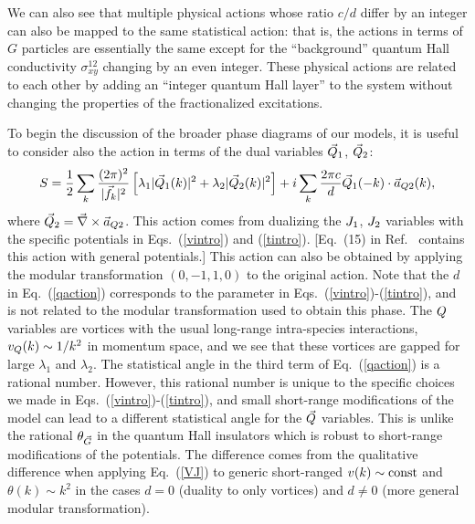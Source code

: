 We can also see that multiple physical actions whose ratio $c/d$ differ by an integer can also be mapped to the same statistical action: that is, the actions in terms of $G$ particles are essentially the same except for the ``background'' quantum Hall conductivity $\sigma^{12}_{xy}$ changing by an even integer. These physical actions are related to each other by adding an ``integer quantum Hall layer'' to the system without changing the properties of the fractionalized excitations. 

To begin the discussion of the broader phase diagrams of our models, it is useful to consider also the action in terms of the dual variables $\vec{Q}_1$, $\vec{Q}_2$:
\begin{eqnarray}
S = \frac{1}{2}\sum_k \frac{(2\pi)^2 }{|\vec{f}_k|^2} \left[\lambda_1|\vec{Q}_1(k)|^2+\lambda_2|\vec{Q}_2(k)|^2\right]
+ i\sum_k \frac{2\pi c}{d} \vec{Q}_1(-k)\cdot \vec{a}_{Q2}(k),
\label{qaction}
\end{eqnarray}
where $\vec{Q}_2=\vec{\nabla}\times\vec{a}_{Q2}$. This action comes from dualizing the $J_1$, $J_2$ variables with the specific potentials in Eqs.~(\ref{vintro}) and (\ref{tintro}). [Eq.~(15) in Ref.~\cite{short_range3} contains this action with general potentials.] This action can also be obtained by applying the modular transformation $(0, -1, 1, 0)$ to the original action. Note that the $d$ in Eq.~(\ref{qaction}) corresponds to the parameter in Eqs.~(\ref{vintro})-(\ref{tintro}), and is not related to the modular transformation used to obtain this phase.  The $Q$ variables are vortices with the usual long-range intra-species interactions, $v_{Q}(k) \sim 1/k^2$ in momentum space, and we see that these vortices are gapped for large $\lambda_1$ and $\lambda_2$.  The statistical angle in the third term of Eq.~(\ref{qaction}) is a rational number.  However, this rational number is unique to the specific choices we made in Eqs.~(\ref{vintro})-(\ref{tintro}), and small short-range modifications of the model can lead to a different statistical angle for the $\vec{Q}$ variables.  This is unlike the rational $\theta_{\vec{G}}$ in the quantum Hall insulators which is robust to short-range modifications of the potentials.  The difference comes from the qualitative difference when applying Eq.~(\ref{VJ}) to generic short-ranged $v(k) \sim {\rm const}$ and $\theta(k) \sim k^2$ in the cases $d=0$ (duality to only vortices) and $d\neq 0$ (more general modular transformation).

